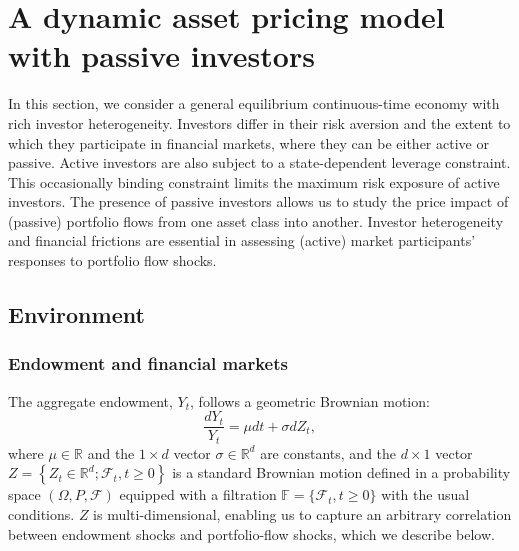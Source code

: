 \section{A dynamic asset pricing model with passive investors}\label{sec:model}

In this section, we consider a general equilibrium continuous-time economy with rich investor heterogeneity. Investors differ in their risk aversion and the extent to which they participate in financial markets, where they can be either active or passive. Active investors are also subject to a state-dependent leverage constraint. This occasionally binding constraint limits the maximum risk exposure of active investors. 
The presence of passive investors allows us to study the price impact of (passive) portfolio flows from one asset class into another. Investor heterogeneity and financial frictions are essential in assessing (active) market participants' responses to portfolio flow shocks.

\subsection{Environment}

\subsubsection{Endowment and financial markets}

The aggregate endowment, $Y_t$, follows a geometric Brownian motion:
\begin{equation}\label{eq:agg_endow}
    \frac{d Y_t}{Y_t} = \mu dt + \sigma dZ_t,
\end{equation}
where $\mu\in\mathbb{R}$ and the $1\times d$ vector $\sigma\in\mathbb{R}^d$ are constants, and the $d\times 1 $ vector $Z=\left\lbrace Z_t\in\mathbb{R}^d;\mathcal{F}_t, t\geq 0\right\rbrace$ is a standard Brownian motion defined in a probability space $(\Omega, P, \mathcal{F})$ equipped with a filtration $\mathbb{F} =\{\mathcal{F}_t,t\geq 0\} $ with the usual conditions. 
$Z$ is multi-dimensional, enabling us to capture an arbitrary correlation between endowment shocks and portfolio-flow shocks, which we describe below.

